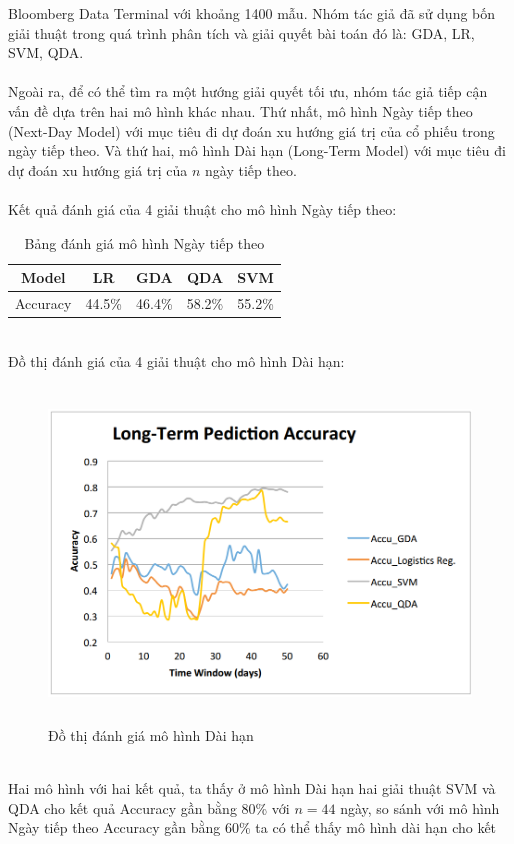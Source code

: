 Bloomberg Data Terminal với khoảng 1400 mẫu. Nhóm tác giả đã sử dụng bốn 
giải thuật trong quá trình phân tích và giải quyết bài toán đó là: GDA, LR, SVM, 
QDA.\\\\
Ngoài ra, để có thể tìm ra một hướng giải quyết tối ưu, nhóm tác giả tiếp cận 
vấn đề dựa trên hai mô hình khác nhau. Thứ nhất, mô hình Ngày tiếp theo (Next-Day 
Model) với mục tiêu đi dự đoán xu hướng giá trị của cổ phiếu trong ngày tiếp 
theo. Và thứ hai, mô hình Dài hạn (Long-Term Model) với mục tiêu đi dự đoán xu 
hướng giá trị của $n$ ngày tiếp theo.\\\\
Kết quả đánh giá của 4 giải thuật cho mô hình Ngày tiếp theo:
\begin{table}[h]
\centering
\begin{tabular}{ |c|c|c|c|c| }
\hline
Model & LR & GDA & QDA & SVM \\
\hline
Accuracy & 44.5\% & 46.4\% & 58.2\% & 55.2\% \\
\hline
\end{tabular}
\caption{Bảng đánh giá mô hình Ngày tiếp theo }
\end{table}\\
Đồ thị đánh giá của 4 giải thuật cho mô hình Dài hạn:
\begin{figure}[h!]
\centering
\includegraphics[height=3.5in, keepaspectratio=true]{longtermmodel.png}
\caption{Đồ thị đánh giá mô hình Dài hạn}
\end{figure}\\
Hai mô hình với hai kết quả, ta thấy ở mô hình Dài hạn hai giải thuật SVM và 
QDA cho kết quả Accuracy gần bằng 80\% với $n=44$ ngày, so sánh với mô hình 
Ngày tiếp theo Accuracy gần bằng 60\% ta có thể thấy mô hình dài hạn cho kết 
